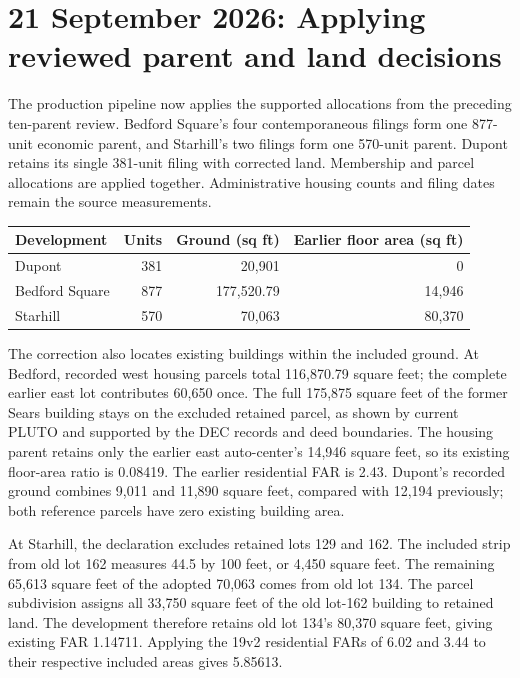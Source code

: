 \clearpage
\section{21 September 2026: Applying reviewed parent and land decisions}

The production pipeline now applies the supported allocations from the
preceding ten-parent review. Bedford Square's four contemporaneous filings form
one 877-unit economic parent, and Starhill's two filings form one 570-unit
parent. Dupont retains its single 381-unit filing with corrected land.
Membership and parcel allocations are applied together. Administrative housing
counts and filing dates remain the source measurements.

\begin{center}
\small
\begin{tabular}{lrrr}
\hline
Development & Units & Ground (sq ft) & Earlier floor area (sq ft) \\
\hline
Dupont & 381 & 20,901 & 0 \\
Bedford Square & 877 & 177,520.79 & 14,946 \\
Starhill & 570 & 70,063 & 80,370 \\
\hline
\end{tabular}
\end{center}

The correction also locates existing buildings within the included ground.
At Bedford, recorded west housing parcels total 116,870.79 square feet; the
complete earlier east lot contributes 60,650 once. The full 175,875 square feet
of the former Sears building stays on the excluded retained parcel, as shown
by current PLUTO and supported by the DEC records and deed boundaries. The
housing parent retains only the earlier east auto-center's 14,946 square feet,
so its existing floor-area ratio is 0.08419. The earlier residential FAR is
2.43. Dupont's recorded ground combines 9,011 and 11,890 square feet, compared
with 12,194 previously; both reference parcels have zero existing building area.

At Starhill, the declaration excludes retained lots 129 and 162. The included
strip from old lot 162 measures 44.5 by 100 feet, or 4,450 square feet. The
remaining 65,613 square feet of the adopted 70,063 comes from old lot 134.
The parcel subdivision assigns all 33,750 square feet of the old lot-162
building to retained land. The development therefore retains old lot 134's
80,370 square feet, giving existing FAR 1.14711. Applying the 19v2 residential
FARs of 6.02 and 3.44 to their respective included areas gives 5.85613.

